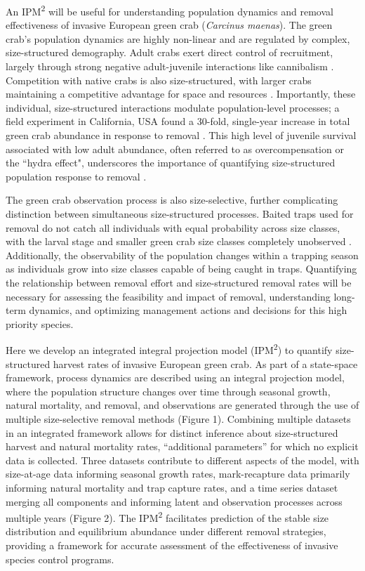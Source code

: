 \documentclass{article}
\begin{document}
An IPM\textsuperscript{2} will be useful for understanding population dynamics and removal effectiveness of invasive European green crab (\textit{Carcinus maenas}). The green crab’s population dynamics are highly non-linear and are regulated by complex, size-structured demography. Adult crabs exert direct control of recruitment, largely through strong negative adult-juvenile interactions like cannibalism
\parencite{grosholz2021stage, romano2017cannibalism}. Competition with native crabs is also size-structured, with larger crabs maintaining a competitive advantage for space and resources \parencite{mcdonald2001competitive, jensen2007biotic}. Importantly, these individual, size-structured interactions modulate population-level processes; a field experiment in California, USA found a 30-fold, single-year increase in total green crab abundance in response to removal \parencite{grosholz2021stage}. This high level of juvenile survival associated with low adult abundance, often referred to as overcompensation or the ``hydra effect", underscores the importance of quantifying size-structured population response to removal \parencite{abrams2009does}. 

The green crab observation process is also size-selective, further complicating distinction between simultaneous size-structured processes. Baited traps used for removal do not catch all individuals with equal probability across size classes, with the larval stage and smaller green crab size classes completely unobserved \parencite{jorgensen2009size}. Additionally, the observability of the population changes within a trapping season as individuals grow into size classes capable of being caught in traps. Quantifying the relationship between removal effort and size-structured removal rates will be necessary for assessing the feasibility and impact of removal, understanding long-term dynamics, and optimizing management actions and decisions for this high priority species. 

Here we develop an integrated integral projection model (IPM\textsuperscript{2}) to quantify size-structured harvest rates of invasive European green crab. As part of a state-space framework, process dynamics are described using an integral projection model, where the population structure changes over time through seasonal growth, natural mortality, and removal, and observations are generated through the use of multiple size-selective removal methods (Figure 1). Combining multiple datasets in an integrated framework allows for distinct inference about size-structured harvest and natural mortality rates, “additional parameters” for which no explicit data is collected. Three datasets contribute to different aspects of the model, with size-at-age data informing seasonal growth rates, mark-recapture data primarily informing natural mortality and trap capture rates, and a time series dataset merging all components and informing latent and observation processes across multiple years (Figure 2). The IPM\textsuperscript{2} facilitates prediction of the stable size distribution and equilibrium abundance under different removal strategies, providing a framework for accurate assessment of the effectiveness of invasive species control programs.
\end{document}
